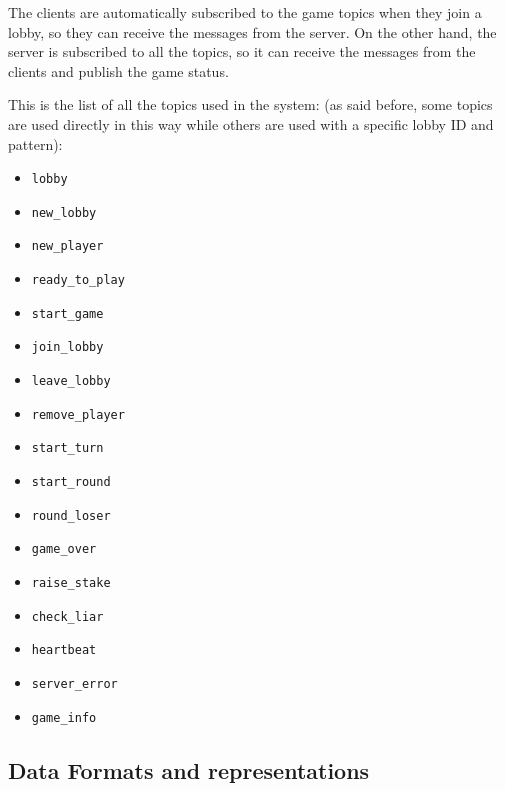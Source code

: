 \documentclass{scrartcl}
\begin{document}
The clients are automatically subscribed to the game topics when they join a lobby, so they can 
receive the messages from the server. On the other hand, the server is subscribed to all the topics, 
so it can receive the messages from the clients and publish the game status.

This is the list of all the topics used in the system: (as said before, some topics are used directly 
in this way while others are used with a specific lobby ID and pattern):
\begin{itemize}
      \item \texttt{lobby}
      \item \texttt{new\_lobby}
      \item \texttt{new\_player}
      \item \texttt{ready\_to\_play}
      \item \texttt{start\_game}
      \item \texttt{join\_lobby}
      \item \texttt{leave\_lobby}
      \item \texttt{remove\_player}
      \item \texttt{start\_turn}
      \item \texttt{start\_round}
      \item \texttt{round\_loser}
      \item \texttt{game\_over}
      \item \texttt{raise\_stake}
      \item \texttt{check\_liar}
      \item \texttt{heartbeat}
      \item \texttt{server\_error}
      \item \texttt{game\_info}
\end{itemize}

\subsection{Data Formats and representations}\label{data-formats}
\end{document}
